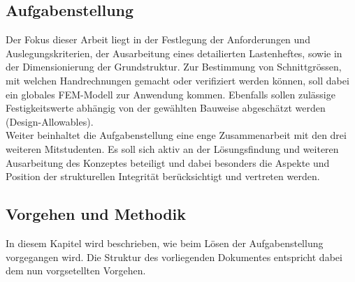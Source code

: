 \subsection{Aufgabenstellung}
\label{Aufgabenstellung}
Der Fokus dieser Arbeit liegt in der Festlegung der Anforderungen und Auslegungskriterien, der Ausarbeitung eines detailierten Lastenheftes, sowie in der Dimensionierung der Grundstruktur. Zur Bestimmung von Schnittgrössen, mit welchen Handrechnungen gemacht oder verifiziert werden können, soll dabei ein globales FEM-Modell zur Anwendung kommen. Ebenfalls sollen zulässige Festigkeitswerte abhängig von der gewählten Bauweise abgeschätzt werden (Design-Allowables).\\
Weiter beinhaltet die Aufgabenstellung eine enge Zusammenarbeit mit den drei weiteren Mitstudenten. Es soll sich aktiv an der Lösungsfindung und weiteren Ausarbeitung des Konzeptes beteiligt und dabei besonders die Aspekte und Position der strukturellen Integrität berücksichtigt und vertreten werden.

\subsection{Vorgehen und Methodik}
In diesem Kapitel wird beschrieben, wie beim Lösen der Aufgabenstellung vorgegangen wird. Die Struktur des vorliegenden Dokumentes entspricht dabei dem nun vorgsetellten Vorgehen.

